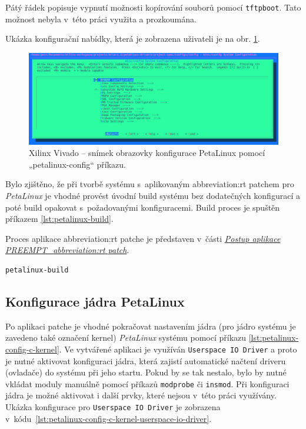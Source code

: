 \documentclass[a4paper, twoside, 11pt]{article}
\begin{document}
	Pátý řádek popisuje vypnutí možnosti kopírování souborů pomocí \texttt{tftpboot}. Tato možnost nebyla v~této práci využita a prozkoumána.\par
	Ukázka konfigurační nabídky, která je zobrazena uživateli je na obr. \ref{fig:terminal-petalinux-config}.\par

\begin{figure}[htbp!]
	\centering
	\includegraphics[width=1\textwidth]{src/jpg/terminal-petalinux-config-crop.jpg}
	\caption{Xilinx Vivado – snímek obrazovky konfigurace PetaLinux pomocí „petalinux-config“ příkazu.}
	\label{fig:terminal-petalinux-config}
\end{figure}


	Bylo zjištěno, že při tvorbě systému s~aplikovaným \gls{abbreviation:rt} patchem pro \textit{PetaLinux} je vhodné provést úvodní build systému bez dodatečných konfigurací a poté build opakovat s~požadovanými konfiguracemi. Build proces je spuštěn příkazem \ref{lst:petalinux-build}.\par
	Proces aplikace \gls{abbreviation:rt} patche je představen v~části \hyperref[subsubsec:postup-aplikace-preempt-rt-patch]{\textit{Postup aplikace PREEMPT\_\gls{abbreviation:rt} patch}}.\par

\begin{lstlisting}[language={sh}, caption={PetaLinux build příkaz pro vytvoření systému.}, label= {lst:petalinux-build}, morekeywords={petalinux-build, petalinux-package, petalinux-config}]
petalinux-build\end{lstlisting}

	\subsection{Konfigurace jádra PetaLinux}
	Po aplikaci patche je vhodné pokračovat nastavením jádra (pro jádro systému je zavedeno také označení kernel) \textit{PetaLinux} systému pomocí příkazu \ref{lst:petalinux-config-c-kernel}. Ve vytvářené aplikaci je využíván \texttt{Userspace IO Driver} a proto je nutné aktivovat konfiguraci jádra, která zajistí automatické načtení driveru (ovladače) do systému při jeho startu. Pokud by se tak nestalo, bylo by nutné vkládat moduly manuálně pomocí příkazů \texttt{modprobe} či \texttt{insmod}. Při konfiguraci jádra je možné aktivovat i další prvky, které nejsou v~této práci využívány. Ukázka konfigurace pro \texttt{Userspace IO Driver} je zobrazena v~kódu~\ref{lst:petalinux-config-c-kernel-userspace-io-driver}.\par
\end{document}
